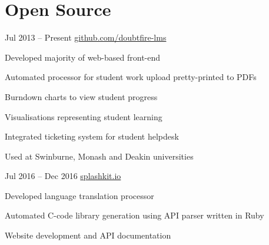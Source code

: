 \section{Open Source}
{Jul 2013 -- Present}
{
}
{\href{http://github.com/doubtfire-lms}{github.com/doubtfire-lms}}
{
  \item Developed majority of web-based front-end
  \item Automated processor for student work upload pretty-printed to PDFs
  \item Burndown charts to view student progress
  \item Visualisations representing student learning
  \item Integrated ticketing system for student helpdesk
  \item Used at Swinburne, Monash and Deakin universities
}

{Jul 2016 -- Dec 2016}
{
  \tag{\Csh}
}
{\href{http://splashkit.io}{splashkit.io}}
{
  \item Developed language translation processor
  \item Automated C-code library generation using API parser written in Ruby
  \item Website development and API documentation
}
